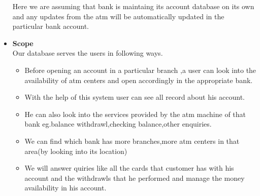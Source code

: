 \documentclass[12pt]{article}
\begin{document}
\begin{itemize}
Here we are assuming that bank is maintaing its account database on its own and any updates from the atm will be automatically updated in the particular bank account.
\item \textbf{Scope}\\

Our database serves the users in following ways.
\begin{itemize}
\item Before opening an account in a particular branch ,a user can look into the availability of atm centers and open accordingly in the appropriate bank.
\item With the help of this system user can see all record about his account.
\item He can also look into the services provided by the atm machine of that bank eg.balance withdrawl,checking balance,other enquiries.
\item We can find which bank has more branches,more atm centers in that area(by looking into its location)
\item We will answer quiries like all the cards that customer has with his account and the withdrawls that he performed and manage the money availability in his account.


\end{itemize}
\end{itemize}
\end{document}
